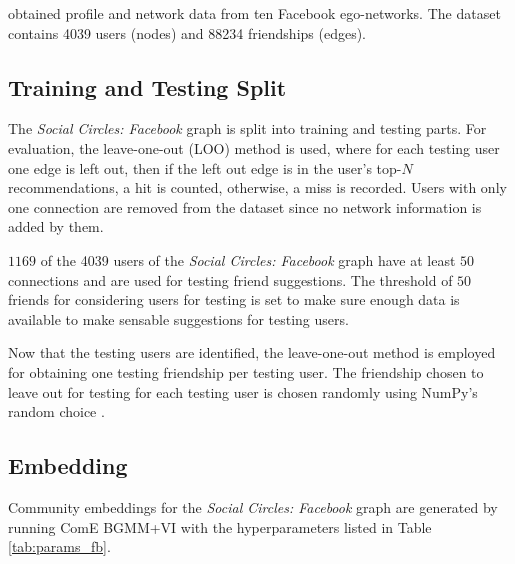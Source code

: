 \documentclass[conference]{IEEEtran}
\begin{document}
\citeauthor{social_circles_in_ego_networks} obtained profile and network data from ten Facebook ego-networks. The dataset contains 4039 users (nodes) and 88234 friendships (edges).

\subsection{Training and Testing Split}

The \textit{Social Circles: Facebook} graph is split into training and testing parts. For evaluation, the leave-one-out (LOO) method is used, where for each testing user one edge is left out, then if the left out edge is in the user's top-$N$ recommendations, a hit is counted, otherwise, a miss is recorded.
Users with only one connection are removed from the dataset since no network information is added by them.

$1169$ of the 4039 users of the \textit{Social Circles: Facebook} graph have at least $50$ connections and are used for testing friend suggestions. The threshold of $50$ friends for considering users for testing is set to make sure enough data is available to make sensable suggestions for testing users.

Now that the testing users are identified, the leave-one-out method is employed for obtaining one testing friendship per testing user. The friendship chosen to leave out for testing for each testing user is chosen randomly using NumPy's random choice \cite{oliphant2006guide, van2011numpy}.

\subsection{Embedding}

Community embeddings for the \textit{Social Circles: Facebook} graph are generated by running ComE BGMM+VI with the hyperparameters listed in Table \ref{tab:params_fb}.
\end{document}

